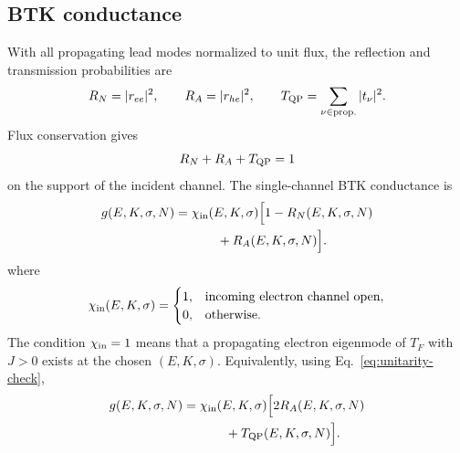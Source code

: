 \subsection{BTK conductance}
\label{subsec:conductance-formula}

With all propagating lead modes normalized to unit flux, the reflection and transmission probabilities are
\begin{equation}
    R_N=|r_{ee}|^2,
    \qquad
    R_A=|r_{he}|^2,
    \qquad
    T_{\rm QP}=\sum_{\nu\in {\rm prop.}}|t_\nu|^2.
    \label{eq:probabilities}
\end{equation}
Flux conservation gives
\begin{equation}
    R_N+R_A+T_{\rm QP}=1
    \label{eq:unitarity-check}
\end{equation}
on the support of the incident channel.  The single-channel BTK conductance is
\begin{equation}
\begin{split}
    g(E,K,\sigma,N)
    ={}&
    \chi_{\rm in}(E,K,\sigma)
    \Bigl[
        1-R_N(E,K,\sigma,N)
    \\
    &\qquad
        +R_A(E,K,\sigma,N)
    \Bigr] .
\end{split}
    \label{eq:channel-conductance}
\end{equation}
where
\begin{equation}
    \chi_{\rm in}(E,K,\sigma)=
    \begin{cases}
        1, & \text{incoming electron channel open},\\
        0, & \text{otherwise}.
    \end{cases}
    \label{eq:chi-in}
\end{equation}
The condition $\chi_{\rm in}=1$ means that a propagating electron eigenmode of $T_F$ with $J>0$ exists at the chosen $(E,K,\sigma)$.  Equivalently, using Eq.~\eqref{eq:unitarity-check},
\begin{equation}
\begin{split}
    g(E,K,\sigma,N)
    ={}&
    \chi_{\rm in}(E,K,\sigma)
    \Bigl[
        2R_A(E,K,\sigma,N)
    \\
    &\qquad
        +T_{\rm QP}(E,K,\sigma,N)
    \Bigr].
\end{split}
    \label{eq:channel-conductance-alt}
\end{equation}

